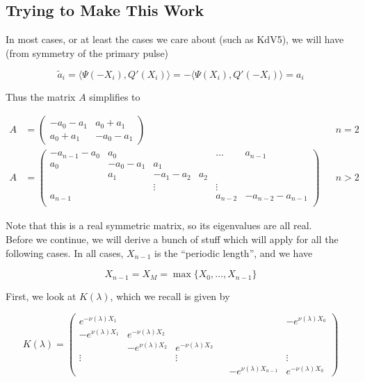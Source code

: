 \documentclass[12pt]{article}
\begin{document}
\subsection{Trying to Make This Work}

In most cases, or at least the cases we care about (such as KdV5), we will have (from symmetry of the primary pulse)

\[
\tilde{a}_i = \langle \Psi(-X_i), Q'(X_i) \rangle
= -\langle \Psi(X_i), Q'(-X_i) \rangle = a_i
\]

Thus the matrix $A$ simplifies to

\begin{align*}
A &= \begin{pmatrix}
-a_0 -a_1 & a_0 + a_1 \\
a_0 + a_1 & -a_0 - a_1
\end{pmatrix} && n = 2 \\
A &= \begin{pmatrix}
-a_{n-1} - a_0 & a_0 & & & \dots & a_{n-1}\\
a_0 & -a_0 - a_1 &  a_1 \\
& a_1 & -a_1 - a_2 &  a_2 \\
& & \vdots & & \vdots \\
a_{n-1} & & & & a_{n-2} & -a_{n-2} - a_{n-1} \\
\end{pmatrix} && n > 2
\end{align*}

Note that this is a real symmetric matrix, so its eigenvalues are all real.\\

Before we continue, we will derive a bunch of stuff which will apply for all the following cases. In all cases, $X_{n-1}$ is the ``periodic length'', and we have

\[
X_{n-1} = X_M = \max\{X_0, \dots, X_{n-1}\}
\]

First, we look at $K(\lambda)$, which we recall is given by 

\begin{equation*}
K(\lambda) = 
\begin{pmatrix}
e^{-\nu(\lambda)X_1} & & & & & -e^{\nu(\lambda)X_0} \\
-e^{\nu(\lambda)X_1} & e^{-\nu(\lambda)X_2} \\
& -e^{\nu(\lambda)X_2} & e^{-\nu(\lambda)X_3} \\
\vdots & & \vdots & &&  \vdots \\
& & & & -e^{\nu(\lambda)X_{n-1}} & e^{-\nu(\lambda)X_0} 
\end{pmatrix}
\end{equation*}
\end{document}
